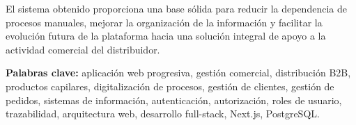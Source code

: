 El sistema obtenido proporciona una base sólida para reducir la dependencia de procesos manuales, mejorar la organización de la información y facilitar la evolución futura de la plataforma hacia una solución integral de apoyo a la actividad comercial del distribuidor.

\vspace{.5cm}

\noindent \textbf{Palabras clave:} aplicación web progresiva, gestión comercial, distribución B2B, productos capilares, digitalización de procesos, gestión de clientes, gestión de pedidos, sistemas de información, autenticación, autorización, roles de usuario, trazabilidad, arquitectura web, desarrollo full-stack, Next.js, PostgreSQL.
